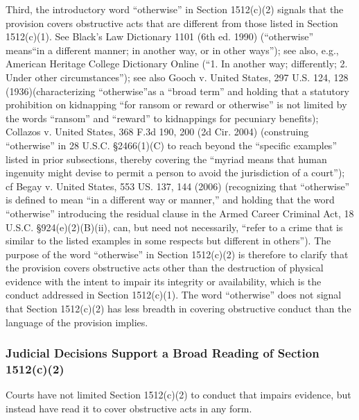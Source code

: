 Third, the introductory word “otherwise” in Section 1512(c)(2) signals that the provision covers obstructive acts that are different from those listed in Section 1512(c)(1).
See Black’s Law Dictionary 1101 (6th ed. 1990) (“otherwise” means“in a different manner; in another way, or in other ways”); see also, e.g., American Heritage College Dictionary Online (“1. In another way; differently; 2. Under other circumstances”);
see also Gooch v. United States, 297 U.S. 124, 128 (1936)(characterizing “otherwise”as a “broad term” and holding that a statutory prohibition on kidnapping “for ransom or reward or otherwise” is not limited by the words “ransom” and “reward” to kidnappings for pecuniary benefits);
Collazos v. United States, 368 F.3d 190, 200 (2d Cir. 2004) (construing “otherwise” in 28 U.S.C. \S 2466(1)(C) to reach beyond the “specific examples” listed in prior subsections, thereby covering the “myriad means that human ingenuity might devise to permit a person to avoid the jurisdiction of a court”);
cf Begay v. United States, 553 US. 137, 144 (2006) (recognizing that “otherwise” is defined to mean “in a different way or manner,” and holding that the word “otherwise” introducing the residual clause in the Armed Career Criminal Act, 18 U.S.C. \S 924(e)(2)(B)(ii), can, but need not necessarily, “refer to a crime that is similar to the listed examples in some respects but different in others”).%
The purpose of the word “otherwise” in Section 1512(c)(2) is therefore to clarify that the provision covers obstructive acts other than the destruction of physical evidence with the intent to impair its integrity or availability, which is the conduct addressed in Section 1512(c)(1).
The word “otherwise” does not signal that Section 1512(c)(2) has less breadth in covering obstructive conduct than the language of the provision implies.

\subsubsection{Judicial Decisions Support a Broad Reading of Section 1512(c)(2)}

Courts have not limited Section 1512(c)(2) to conduct that impairs evidence, but instead have read it to cover obstructive acts in any form.

